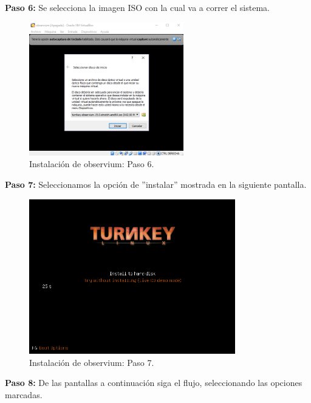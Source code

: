 \pagebreak
\noindent
\textbf{Paso 6:} Se selecciona la imagen ISO con la cual va a correr el sistema.

\begin{figure}[htbp!]
	\centering
		\includegraphics[width=0.6\textwidth]{images/desarrollo/instalarObservium_paso6.png}
	\caption{Instalación de observium: Paso 6.}
\end{figure}

\pagebreak
\noindent
\textbf{Paso 7:} Seleccionamos la opción de ''instalar'' mostrada en la siguiente pantalla. 

\begin{figure}[htbp!]
	\centering
		\includegraphics[width=0.8\textwidth]{images/desarrollo/instalarObservium_paso7.png}
	\caption{Instalación de observium: Paso 7.}
\end{figure}

\pagebreak
\noindent
\textbf{Paso 8:} De las pantallas a continuación siga el flujo, seleccionando las opciones marcadas. 

